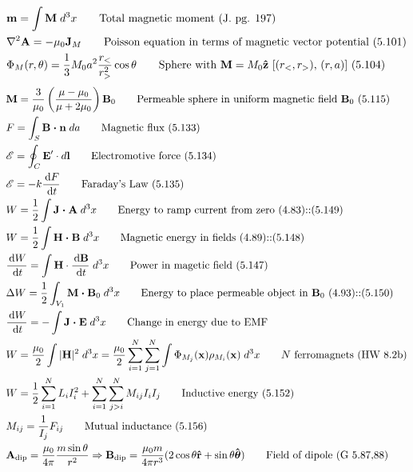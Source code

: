 \documentclass[10pt]{article}
\newcommand{\rhat}{\boldsymbol{\hat{\textbf{r}}}}
\newcommand{\zhat}{\boldsymbol{\hat{\textbf{z}}}}
\newcommand{\thetahat}{\boldsymbol{\hat{\textbf{$\theta$}}}}
\newcommand{\ve}[1]{\boldsymbol{\mathbf{#1}}}
\newcommand{\vect}[1]{\boldsymbol{\mathbf{#1}}}
\newcommand{\dd}{\, \mathrm{d}}
\newcommand{\tder}[2]{\frac{\dd #1}{\dd #2}}
\begin{document}
\begin{multicols}{2}
\begin{align*}
		& \ve{m} = \int \ve{M} \; d^3 x \tag*{Total magnetic moment (J. pg. 197)} \\
		& \nabla^2 \vect{A} = -\mu_0 \vect{J}_M \tag*{Poisson equation in terms of magnetic vector potential (5.101)} \\
		& \Phi_M(r,\theta) = \frac{1}{3} M_0 a^2 \frac{r_<}{r_>^2} \cos \theta \tag*{Sphere with $\ve{M} = M_0 \zhat$ [$(r_<,r_>)$, $(r,a)$] (5.104)} \\
	\end{align*}
	\setlength{\abovedisplayskip}{-25pt}
	\setlength{\belowdisplayskip}{0pt}
	\setlength{\abovedisplayshortskip}{0pt}
	\setlength{\belowdisplayshortskip}{0pt}
	\begin{align*} 
		& \vect{M} = \frac{3}{\mu_0} \left( \frac{\mu - \mu_0}{\mu + 2 \mu_0} \right) \vect{B}_0 \tag*{Permeable sphere in uniform magnetic field $\ve{B}_0$ (5.115)} \\
		& F = \int_S \vect{B \cdot n} \; da \tag*{Magnetic flux (5.133)} \\
		& \mathscr{E} = \oint_C \vect{E}' \cdot d \vect{l} \tag*{Electromotive force (5.134)} \\
		& \mathscr{E} = -k \tder{F}{t} \tag*{Faraday's Law (5.135)} \\
		& W = \frac{1}{2} \int \vect{J \cdot A} \; d^3 x  \tag*{Energy to ramp current from zero (4.83)::(5.149)} \\
		& W = \frac{1}{2} \int \vect{H \cdot B} \; d^3 x \tag*{Magnetic energy in fields (4.89)::(5.148)} \\
		& \tder{W}{t} = \int \ve{H} \cdot \tder{\ve{B}}{t} \; d^3 x \tag*{Power in magetic field (5.147)} \\
		& \Delta W = \frac{1}{2} \int_{V_1} \vect{M \cdot B}_0 \; d^3 x \tag*{Energy to place permeable object in $\ve{B}_0$ (4.93)::(5.150)} \\
		& \tder{W}{t} = - \int \ve{J \cdot E} \; d^3 x \tag*{Change in energy due to EMF} \\
		& W = \frac{\mu_0}{2} \int |\ve{H}|^2 \; d^3 x = \frac{\mu_0}{2} \sum_{i=1}^{N} \sum_{j=1}^{N} \int \Phi_{M_j}(\ve{x}) \rho_{M_i}(\ve{x}) \; d^3 x \tag*{$N$ ferromagnets (HW 8.2b)} \\
		& W = \frac{1}{2} \sum_{i=1}^N L_i I_i^2 + \sum_{i=1}^N \sum_{j>i}^N M_{ij} I_i I_j \tag*{Inductive energy (5.152)} \\
		& M_{ij} = \frac{1}{I_j} F_{ij} \tag*{Mutual inductance (5.156)} \\
		&\ve{A}_{\text{dip}} = \frac{\mu_0}{4 \pi} \frac{m \sin \theta}{r^2} \Rightarrow \ve{B}_{\text{dip}} = \frac{\mu_0 m}{4 \pi r^3}(2 \cos \theta \rhat + \sin \theta \thetahat) \tag*{Field of dipole (G 5.87,88)} \\

\end{align*}
\end{multicols}
\end{document}
